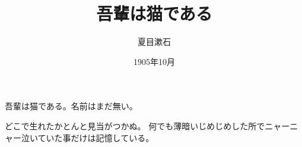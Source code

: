 \documentclass{tarticle}
\title{吾輩は猫である}
\author{夏目漱石}
\date{1905年10月}
\begin{document}
吾輩は猫である。名前はまだ無い。

どこで生れたかとんと見当がつかぬ。
何でも薄暗いじめじめした所でニャーニャー泣いていた事だけは記憶している。
\end{document}
